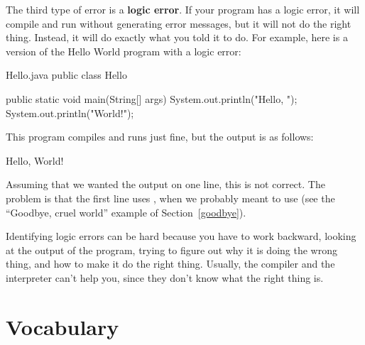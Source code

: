 
The third type of error is a {\bf logic error}.
If your program has a logic error, it will compile and run without generating error messages, but it will not do the right thing.
Instead, it will do exactly what you told it to do.
For example, here is a version of the Hello World program with a logic error:

\begin{trinket}[235]{Hello.java}
public class Hello {

    public static void main(String[] args) {
        System.out.println("Hello, ");
        System.out.println("World!");
    }
}
\end{trinket}

This program compiles and runs just fine, but the output is as follows:

\begin{stdout}
Hello,
World!
\end{stdout}

Assuming that we wanted the output on one line, this is not correct.
The problem is that the first line uses , when we probably meant to use  (see the ``Goodbye, cruel world'' example of Section~\ref{goodbye}).

Identifying logic errors can be hard because you have to work backward, looking at the output of the program, trying to figure out why it is doing the wrong thing, and how to make it do the right thing.
Usually, the compiler and the interpreter can't help you, since they don't know what the right thing is.


\section{Vocabulary}

